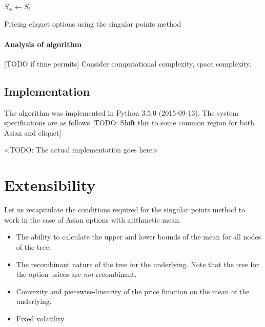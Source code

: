 \begin{algorithm}[H]
{{			
			
			
			$ S_+ \leftarrow S_i $ \;
		}
	}
	
	\caption{Pricing cliquet options using the singular points method}
\end{algorithm}

\paragraph{Analysis of algorithm}
[TODO if time permits] Consider computational complexity, space complexity.


\subsection{Implementation}
The algorithm was implemented in Python 3.5.0 (2015-09-13).
The system specifications are as follows
[TODO: Shift this to some common region for both Asian and cliquet]

<TODO: The actual implementation goes here>



\section{Extensibility}
\label{sec:asian-extensions}

Let us recapitulate the conditions required for the singular points method to work in the case of Asian options with arithmetic mean.
\begin{itemize}
\item The ability to calculate the upper and lower bounds of the mean for all nodes of the tree.
\item The recombinant nature of the tree for the underlying. Note that the tree for the option prices are \emph{not} recombinant.
\item Convexity and piecewise-linearity of the price function on the mean of the underlying.
\item Fixed volatility
\end{itemize}

